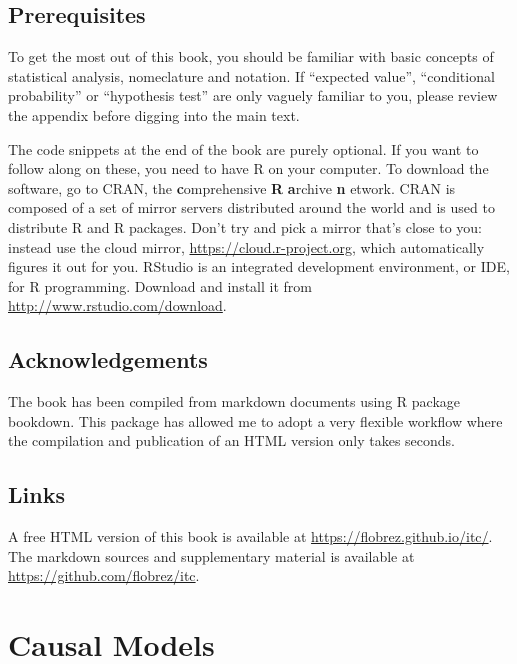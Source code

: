 \documentclass[
]{book}
\theoremstyle{definition}
\theoremstyle{definition}
\theoremstyle{definition}
\theoremstyle{remark}
\begin{document}
\hypertarget{prerequisites}{%
\section{Prerequisites}\label{prerequisites}}

To get the most out of this book, you should be familiar with basic concepts of statistical analysis, nomeclature and notation. If ``expected value'', ``conditional probability'' or ``hypothesis test'' are only vaguely familiar to you, please review the appendix before digging into the main text.

The code snippets at the end of the book are purely optional. If you want to follow along on these, you need to have R on your computer. To download the software, go to CRAN, the \textbf{c}omprehensive \textbf{R} \textbf{a}rchive \textbf{n} etwork. CRAN is composed of a set of mirror servers distributed around the world and is used to distribute R and R packages. Don't try and pick a mirror that's close to you: instead use the cloud mirror, \url{https://cloud.r-project.org}, which automatically figures it out for you. RStudio is an integrated development environment, or IDE, for R programming. Download and install it from \url{http://www.rstudio.com/download}.

\hypertarget{acknowledgements}{%
\section{Acknowledgements}\label{acknowledgements}}

The book has been compiled from markdown documents using R package bookdown. This package has allowed me to adopt a very flexible workflow where the compilation and publication of an HTML version only takes seconds.

\hypertarget{links}{%
\section{Links}\label{links}}

A free HTML version of this book is available at \url{https://flobrez.github.io/itc/}. The markdown sources and supplementary material is available at \url{https://github.com/flobrez/itc}.

\hypertarget{causal-models}{%
\chapter{Causal Models}\label{causal-models}}
\end{document}

